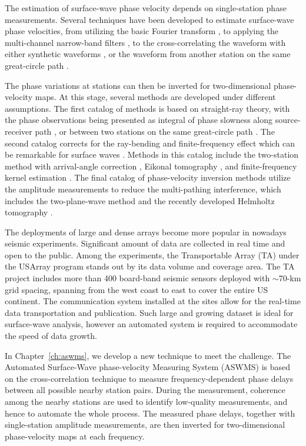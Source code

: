 \documentclass[12pt,oneside]{book}
\begin{document}
The estimation of surface-wave phase velocity depends on single-station phase measurements. Several techniques have been developed to estimate surface-wave phase velocities, from utilizing the basic Fourier transform \citep{Forsyth:2005id}, to applying the multi-channel narrow-band filters \citep[e.g.][]{Levshin:1992ve}, to the cross-correlating the waveform with either synthetic waveforms \citep[e.g.][]{Gee:1992ww}, or the waveform from another station on the same great-circle path \citep[e.g.][]{Landisman:1969gt}.

The phase variations at stations can then be inverted for two-dimensional phase-velocity maps. At this stage, several methods are developed under different assumptions. The first catalog of methods is based on straight-ray theory, with the phase observations being presented as integral of phase slowness along source-receiver path \citep[e.g.][]{Nettles:2008ha}, or between two stations on the same great-circle path \citep[e.g.][]{Yao:2005ha,Foster:2014kna}. The second catalog corrects for the ray-bending and finite-frequency effect which can be remarkable for surface waves \citep[e.g.][]{Evernden:1954ui,Zhou:2005fk}. Methods in this catalog include the two-station method with arrival-angle correction \citep{Foster:2014kna}, Eikonal tomography \citep{Lin:2009fx}, and finite-frequency kernel estimation \citep{Zhou:2006gna}. The final catalog of phase-velocity inversion methods utilize the amplitude measurements to reduce the multi-pathing interference, which includes the two-plane-wave method \citep{Forsyth:2005id} and the recently developed Helmholtz tomography \citep{Lin:2011fw}.

The deployments of large and dense arrays become more popular in nowadays seismic experiments. Significant amount of data are collected in real time and open to the public. 
Among the experiments, the Transportable Array (TA) under the USArray program stands out by its data volume and coverage area. The TA project includes more than 400 board-band seismic sensors deployed with $\sim$70-km grid spacing, spanning from the west coast to east to cover the entire US continent. The communication system installed at the sites allow for the real-time data transportation and publication. Such large and growing dataset is ideal for surface-wave analysis, however an automated system is required to accommodate the speed of data growth.

In Chapter~\ref{ch:aswms}, we develop a new technique to meet the challenge. The Automated Surface-Wave phase-velocity Measuring System (ASWMS) is based on the cross-correlation technique to measure frequency-dependent phase delays between all possible nearby station pairs. 
During the measurement, coherence among the nearby stations are used to identify low-quality measurements, and hence to automate the whole process. 
The measured phase delays, together with single-station amplitude measurements, are then inverted for two-dimensional phase-velocity maps at each frequency.
\end{document}
